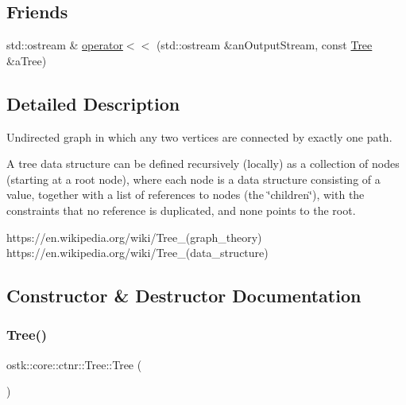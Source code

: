 \subsection*{Friends}
\begin{DoxyCompactItemize}
\item 
std\+::ostream \& \hyperlink{classostk_1_1core_1_1ctnr_1_1_tree_aca74cf66509d8f31b83b1c100cb00bea}{operator$<$$<$} (std\+::ostream \&an\+Output\+Stream, const \hyperlink{classostk_1_1core_1_1ctnr_1_1_tree}{Tree} \&a\+Tree)
\end{DoxyCompactItemize}


\subsection{Detailed Description}
Undirected graph in which any two vertices are connected by exactly one path. 

A tree data structure can be defined recursively (locally) as a collection of nodes (starting at a root node), where each node is a data structure consisting of a value, together with a list of references to nodes (the \char`\"{}children\char`\"{}), with the constraints that no reference is duplicated, and none points to the root.

https\+://en.wikipedia.\+org/wiki/\+Tree\+\_\+(graph\+\_\+theory) https\+://en.wikipedia.\+org/wiki/\+Tree\+\_\+(data\+\_\+structure) 

\subsection{Constructor \& Destructor Documentation}
\mbox{\label{classostk_1_1core_1_1ctnr_1_1_tree_a3960a2c77a482f88cdcdf5271b295815}} 
\subsubsection{\texorpdfstring{Tree()}{Tree()}\hspace{0.1cm}{\footnotesize\ttfamily [1/2]}}
{\footnotesize\ttfamily ostk\+::core\+::ctnr\+::\+Tree\+::\+Tree (\begin{DoxyParamCaption}{ }\end{DoxyParamCaption})\hspace{0.3cm}{\ttfamily [delete]}}

